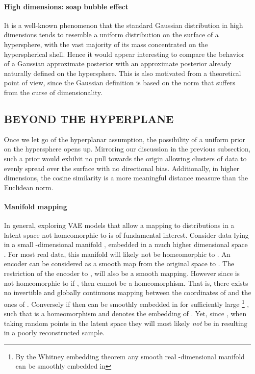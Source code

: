 \documentclass[letterpaper]{article}
\begin{document}
\paragraph{High dimensions: soap bubble effect} \label{par:highdim}
It is a well-known phenomenon that the standard Gaussian distribution in high dimensions tends to resemble a uniform distribution on the surface of a hypersphere, with the vast majority of its mass concentrated on the hyperspherical shell. Hence it would appear interesting to compare the behavior of a Gaussian approximate posterior with an approximate posterior already naturally defined on the hypersphere. This is also motivated from a theoretical point of view, since the Gaussian definition is based on the  norm that suffers from the curse of dimensionality.

\subsection{BEYOND THE HYPERPLANE} \label{subsec:beyond-hyperplanes}
Once we let go of the hyperplanar assumption, the possibility of a uniform prior on the hypersphere opens up. Mirroring our discussion in the previous subsection, such a prior would exhibit no pull towards the origin allowing clusters of data to evenly spread over the surface with no directional bias. Additionally, in higher dimensions, the cosine similarity is a more meaningful distance measure than the Euclidean norm.
 
\paragraph{Manifold mapping}\label{par:manifold}
In general, exploring VAE models that allow a mapping to distributions in a latent space not homeomorphic to  is of fundamental interest. Consider data lying in a small -dimensional manifold , embedded in a much higher dimensional space . For most real data, this manifold will likely not be homeomorphic to . An encoder can be considered as a smooth map  from the original space to . The restriction of the encoder to ,  will also be a smooth mapping. However since  is not homeomorphic to  if , then  cannot be a homeomorphism. That is, there exists no invertible and globally continuous mapping between the coordinates of  and the ones of . Conversely if  then  can be smoothly embedded in  for  sufficiently large
\footnote{By the Whitney embedding theorem any smooth real -dimensional manifold can be smoothly embedded in }
, such that  is a homeomorphism and  denotes the embedding of . Yet, since , when taking random points in the latent space they will most likely \textit{not} be in  resulting in a poorly reconstructed sample. 
 
\end{document}
